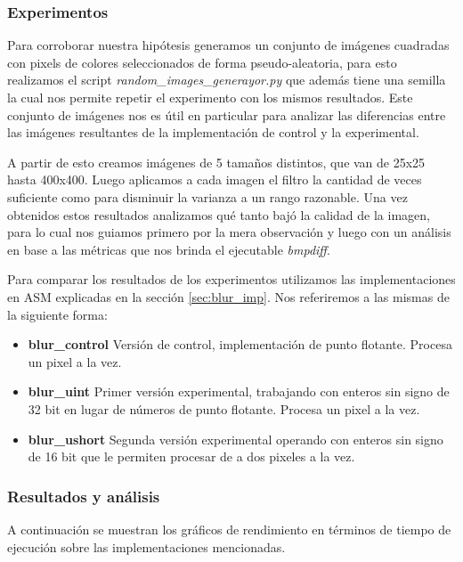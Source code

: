 \subsubsection{Experimentos}

Para corroborar nuestra hipótesis generamos un conjunto de imágenes cuadradas
con pixels de colores seleccionados de forma pseudo-aleatoria, para esto
realizamos el script \textit{random\_images\_generayor.py} que además tiene una semilla
la cual nos permite repetir el experimento con los mismos resultados. Este
conjunto de imágenes nos es útil en particular para analizar las diferencias
entre las imágenes resultantes de la implementación de control y la
experimental.

A partir de esto creamos imágenes de 5 tamaños distintos, que van de 25x25
hasta 400x400. Luego aplicamos a cada imagen el filtro la cantidad de veces
suficiente como para disminuir la varianza a un rango razonable. Una vez obtenidos estos
resultados analizamos qué tanto bajó la calidad de la imagen, para lo cual nos
guiamos primero por la mera observación y luego con un análisis en base a las
métricas que nos brinda el ejecutable \textit{bmpdiff}.

Para comparar los resultados de los experimentos utilizamos las implementaciones
en ASM explicadas en la sección \ref{sec:blur_imp}. Nos referiremos a las mismas
de la siguiente forma:

\begin{itemize}
	\item \textbf{blur\_control}
		Versión de control, implementación de punto flotante. Procesa un pixel a
		la vez.
	\item \textbf{blur\_uint}
		Primer versión experimental, trabajando con enteros sin signo de 32 bit en lugar
		de números de punto flotante. Procesa un pixel a la vez.
	\item \textbf{blur\_ushort}
		Segunda versión experimental operando con enteros sin signo de 16 bit
		que le permiten procesar de a dos pixeles a la vez.
\end{itemize}

\subsubsection{Resultados y análisis}

A continuación se muestran los gráficos de rendimiento en términos de tiempo de
ejecución sobre las implementaciones mencionadas.

